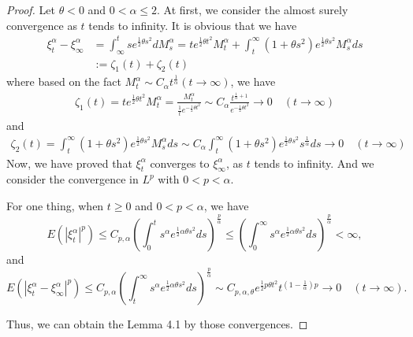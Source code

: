 \documentclass[11pt]{amsart}
\theoremstyle{plain}
\numberwithin{equation}{section}
\begin{document}
\begin{proof}
Let $\theta<0$ and $0<\alpha\leq 2$. At first, we consider the almost surely convergence as $t$ tends to infinity. It is obvious that we have
\begin{equation*}
\begin{aligned}
\xi_t^\alpha-\xi_\infty^\alpha&=\int_\infty^t se^{\frac{1}{2}\theta s^2}dM_s^\alpha=te^{\frac{1}{2}\theta t^2}M_t^\alpha+\int_t^\infty(1+\theta s^2)e^{\frac{1}{2}\theta s^2}M_s^\alpha ds\\
&:=\zeta_1(t)+\zeta_2(t)
\end{aligned}
\end{equation*}
where based on the fact $M_t^\alpha\sim C_\alpha t^{\frac{1}{\alpha}}(t\rightarrow\infty)$, we have
\begin{equation*}
\begin{aligned}
\zeta_1(t)=te^{\frac{1}{2}\theta t^2}M_t^\alpha=\frac{M_t^\alpha}{\frac{1}{t}e^{-\frac{1}{2}\theta t^2}}\sim C_\alpha\frac{t^{\frac{1}{\alpha}+1}}{e^{-\frac{1}{2}\theta t^2}}\longrightarrow 0\quad(t\rightarrow\infty)
\end{aligned}
\end{equation*}
and 
\begin{equation*}
\begin{aligned}
\zeta_2(t)=\int_t^\infty(1+\theta s^2)e^{\frac{1}{2}\theta s^2}M_s^\alpha ds\sim C_\alpha\int_t^\infty (1+\theta s^2)e^{\frac{1}{2}\theta s^2}s^{\frac{1}{\alpha}}ds\longrightarrow 0 \quad(t\rightarrow\infty)
\end{aligned}
\end{equation*}
Now, we have proved that $\xi_t^\alpha$ converges to $\xi_\infty^\alpha$, as $t$ tends to infinity. And we consider the convergence in $L^p$ with $0<p<\alpha$.

For one thing, when $t\geq 0$ and $0<p<\alpha$, we have
$$
E(|\xi_t^\alpha|^p)\leq C_{p,\alpha}\left(\int_0^t s^\alpha e^{\frac{1}{2}\alpha \theta s^2}ds\right)^{\frac{p}{\alpha}}\leq \left(\int_0^\infty s^\alpha e^{\frac{1}{2}\alpha\theta s^2}ds\right)^{\frac{p}{\alpha}}<\infty,
$$
and
$$
E(|\xi_t^\alpha-\xi_\infty^\alpha|^p)\leq C_{p,\alpha}\left(\int_t^\infty s^\alpha e^{\frac{1}{2}\alpha\theta s^2}ds\right)^{\frac{p}{\alpha}}\sim C_{p,\alpha,\theta}e^{\frac{1}{2}p\theta t^2}t^{(1-\frac{1}{\alpha})p}\longrightarrow 0 \quad(t\rightarrow \infty).
$$

Thus, we can obtain the Lemma 4.1 by those convergences.
\end{proof}
\end{document}
